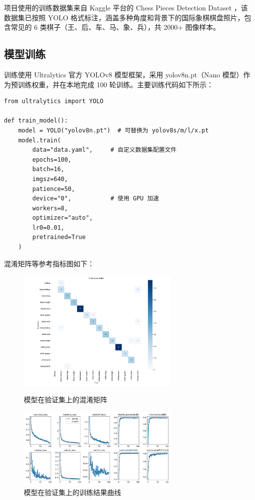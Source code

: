 \documentclass[UTF8,zihao=-4]{oucart}
\begin{document}
项目使用的训练数据集来自 Kaggle 平台的 Chess Pieces Detection Dataset \cite{kaggledata}，该数据集已按照 YOLO 格式标注，涵盖多种角度和背景下的国际象棋棋盘照片，包含常见的 6 类棋子（王、后、车、马、象、兵），共 2000+ 图像样本。

\subsection{模型训练}

训练使用 Ultralytics 官方 YOLOv8 模型框架，采用 yolov8n.pt（Nano 模型）作为预训练权重，并在本地完成 100 轮训练。主要训练代码如下所示：

\begin{lstlisting}[caption={YOLOv8 棋子检测模型训练代码}]
from ultralytics import YOLO

def train_model():
    model = YOLO("yolov8n.pt")  # 可替换为 yolov8s/m/l/x.pt
    model.train(
        data="data.yaml",     # 自定义数据集配置文件
        epochs=100,
        batch=16,
        imgsz=640,
        patience=50,
        device="0",           # 使用 GPU 加速
        workers=8,
        optimizer="auto",
        lr0=0.01,
        pretrained=True
    )
\end{lstlisting}

混淆矩阵等参考指标图如下：

\begin{figure}[h]
    \centering
    \includegraphics[width=0.7\textwidth]{assets/混淆矩阵.png}
    \caption{模型在验证集上的混淆矩阵}
    \centering
    \includegraphics[width=0.7\textwidth]{assets/results.png}
    \caption{模型在验证集上的训练结果曲线}
\end{figure}
\end{document}
